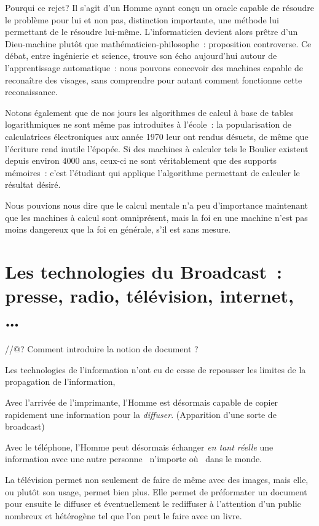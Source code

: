 Pourqui ce rejet? Il s'agit d'un Homme ayant conçu un \og{}oracle\fg{} capable de résoudre le problème pour lui et non pas, distinction importante, une méthode lui permettant de le résoudre lui-même. L'informaticien devient alors prêtre d'un Dieu-machine plutôt que mathématicien-philosophe~: proposition controverse. Ce débat, entre ingénierie et science, trouve son écho aujourd'hui autour de l'apprentissage automatique~: nous pouvons concevoir des machines capable de reconaître des visages, sans comprendre pour autant comment fonctionne cette reconaissance. 

Notons également que de nos jours les algorithmes de calcul à base de tables logarithmiques ne sont même pas introduites à l'école~: la popularisation de calculatrices électroniques aux année 1970 leur ont rendus désuets, de même que l'écriture rend inutile l'épopée. Si des machines à calculer tels le Boulier existent depuis environ 4000 ans, ceux-ci ne sont véritablement que des supports mémoires~: c'est l'étudiant qui applique l'algorithme permettant de calculer le résultat désiré. 

Nous pouvions nous dire que le calcul mentale n'a peu d'importance maintenant que les machines à calcul sont omniprésent, mais la foi en une machine n'est pas moins dangereux que la foi en générale, s'il est sans mesure. 


\chapter{Les technologies du \og{}Broadcast\fg{}~: presse, radio, télévision, internet, \ldots}


//@? Comment introduire la notion de document ?

Les technologies de l'information n'ont eu de cesse de repousser les limites de
la propagation de l'information, 

Avec l'arrivée de l'imprimante, l'Homme est désormais capable de copier
rapidement une information pour la \emph{diffuser}. (Apparition d'une sorte
de broadcast)

Avec le téléphone, l'Homme peut désormais échanger \emph{en tant réelle} une 
information avec une autre personne \og{}~n'importe où~\fg{} dans le monde.

La télévision permet non seulement de faire de même avec des images, mais elle,
ou plutôt son usage, permet bien plus. Elle permet de préformater un document pour ensuite le
diffuser et éventuellement le rediffuser à l'attention d'un public nombreux et
hétérogène tel que l'on peut le faire avec un livre.

